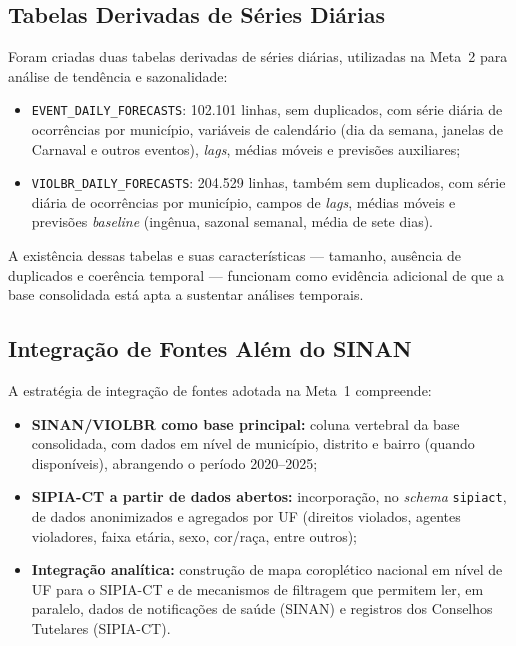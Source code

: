 \documentclass[11pt,a4paper]{article}
\begin{document}
\subsection{Tabelas Derivadas de Séries Diárias}
\label{subsec:series_diarias}

Foram criadas duas tabelas derivadas de séries diárias, utilizadas na Meta~2 para análise de tendência e sazonalidade:

\begin{itemize}
  \item \texttt{EVENT\_DAILY\_FORECASTS}: 102.101 linhas, sem duplicados, com série diária de ocorrências por município, variáveis de calendário (dia da semana, janelas de Carnaval e outros eventos), \emph{lags}, médias móveis e previsões auxiliares;
  \item \texttt{VIOLBR\_DAILY\_FORECASTS}: 204.529 linhas, também sem duplicados, com série diária de ocorrências por município, campos de \emph{lags}, médias móveis e previsões \emph{baseline} (ingênua, sazonal semanal, média de sete dias).
\end{itemize}

A existência dessas tabelas e suas características — tamanho, ausência de duplicados e coerência temporal — funcionam como evidência adicional de que a base consolidada está apta a sustentar análises temporais.

\subsection{Integração de Fontes Além do SINAN}
\label{subsec:integracao_fontes}

A estratégia de integração de fontes adotada na Meta~1 compreende:

\begin{itemize}
  \item \textbf{SINAN/VIOLBR como base principal:} coluna vertebral da base consolidada, com dados em nível de município, distrito e bairro (quando disponíveis), abrangendo o período 2020–2025;
  \item \textbf{SIPIA-CT a partir de dados abertos:} incorporação, no \emph{schema} \texttt{sipiact}, de dados anonimizados e agregados por UF (direitos violados, agentes violadores, faixa etária, sexo, cor/raça, entre outros);
  \item \textbf{Integração analítica:} construção de mapa coroplético nacional em nível de UF para o SIPIA-CT e de mecanismos de filtragem que permitem ler, em paralelo, dados de notificações de saúde (SINAN) e registros dos Conselhos Tutelares (SIPIA-CT).
\end{itemize}
\end{document}
